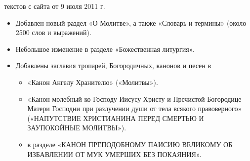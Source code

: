 { текстов с сайта от 9 июля 2011 г.

\begin{itemize}

\item Добавлен новый раздел «О Молитве», а также «Словарь и термины» (около 2500 слов и выражений).

\item Небольшое изменение в разделе «Божественная литургия».

\item Добавлены заглавия тропарей, Богородичных, канонов и песен в

\begin{itemize}

\item «Канон Ангелу Хранителю» («Молитвы»).

\item «Канон молебный ко Господу Иисусу Христу и Пречистой Богородице Матери Господни при разлучении души от тела всякого правоверного» («НАПУТСТВИЕ ХРИСТИАНИНА ПЕРЕД СМЕРТЬЮ И ЗАУПОКОЙНЫЕ МОЛИТВЫ»).

\item в разделе «КАНОН ПРЕПОДОБНОМУ ПАИСИЮ ВЕЛИКОМУ ОБ ИЗБАВЛЕНИИ ОТ МУК УМЕРШИХ БЕЗ ПОКАЯНИЯ».

\end{itemize}
\end{itemize}}


